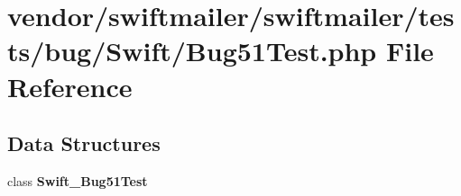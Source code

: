 \section{vendor/swiftmailer/swiftmailer/tests/bug/\+Swift/\+Bug51\+Test.php File Reference}
\label{_bug51_test_8php}
\subsection*{Data Structures}
\begin{DoxyCompactItemize}
\item 
class {\bf Swift\+\_\+\+Bug51\+Test}
\end{DoxyCompactItemize}

